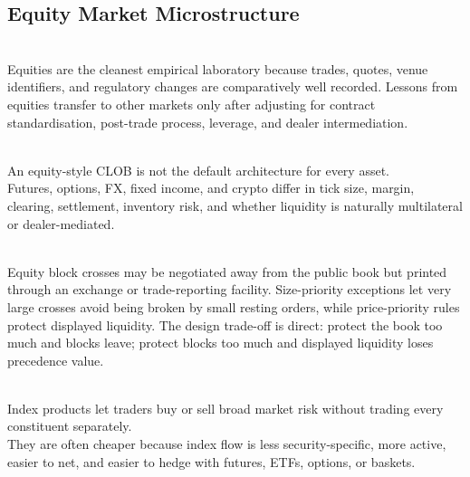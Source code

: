 \subsection{Equity Market Microstructure}

\begin{principle} \\
Equities are the cleanest empirical laboratory because trades, quotes, venue identifiers, and regulatory changes are comparatively well recorded. Lessons from equities transfer to other markets only after adjusting for contract standardisation, post-trade process, leverage, and dealer intermediation.
\end{principle}

\begin{caveat} \\
An equity-style CLOB is not the default architecture for every asset.\\
Futures, options, FX, fixed income, and crypto differ in tick size, margin, clearing, settlement, inventory risk, and whether liquidity is naturally multilateral or dealer-mediated.
\end{caveat}

\begin{marketrule} \\
Equity block crosses may be negotiated away from the public book but printed through an exchange or trade-reporting facility. Size-priority exceptions let very large crosses avoid being broken by small resting orders, while price-priority rules protect displayed liquidity. The design trade-off is direct: protect the book too much and blocks leave; protect blocks too much and displayed liquidity loses precedence value.
\end{marketrule}

\begin{principle} \\
Index products let traders buy or sell broad market risk without trading every constituent separately.\\
They are often cheaper because index flow is less security-specific, more active, easier to net, and easier to hedge with futures, ETFs, options, or baskets.
\end{principle}

